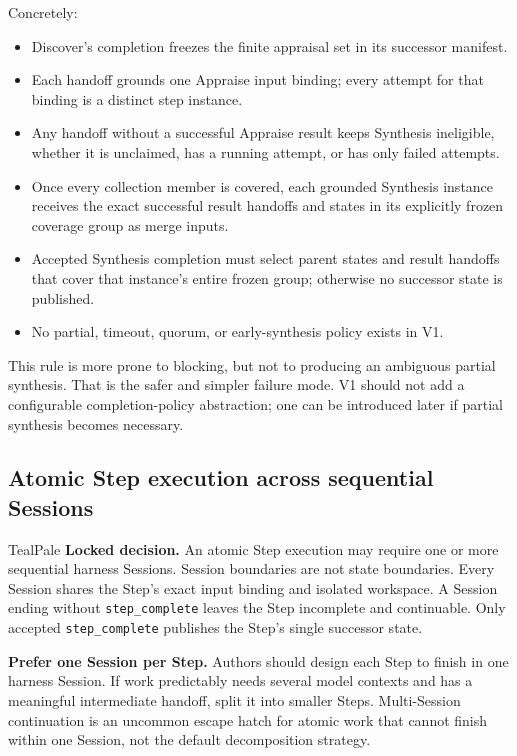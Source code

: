 \documentclass[11pt]{article}
\begin{document}
Concretely:

\begin{itemize}
  \item Discover's completion freezes the finite appraisal set in its successor manifest.
  \item Each handoff grounds one Appraise input binding; every attempt for that binding is a distinct step instance.
  \item Any handoff without a successful Appraise result keeps Synthesis ineligible, whether it is unclaimed, has a running attempt, or has only failed attempts.
  \item Once every collection member is covered, each grounded Synthesis instance receives the exact successful result handoffs and states in its explicitly frozen coverage group as merge inputs.
  \item Accepted Synthesis completion must select parent states and result handoffs that cover that instance's entire frozen group; otherwise no successor state is published.
  \item No partial, timeout, quorum, or early-synthesis policy exists in V1.
\end{itemize}

This rule is more prone to blocking, but not to producing an ambiguous partial synthesis. That is the safer and simpler failure mode. V1 should not add a configurable completion-policy abstraction; one can be introduced later if partial synthesis becomes necessary.

\clearpage
\thispagestyle{fancy}
\subsection{Atomic Step execution across sequential Sessions}

\begin{decisionbox}{TealPale}
\textbf{Locked decision.} An atomic Step execution may require one or more sequential harness Sessions. Session boundaries are not state boundaries. Every Session shares the Step's exact input binding and isolated workspace. A Session ending without \texttt{step\_complete} leaves the Step incomplete and continuable. Only accepted \texttt{step\_complete} publishes the Step's single successor state.
\end{decisionbox}

\begin{summarybox}
\textbf{Prefer one Session per Step.} Authors should design each Step to finish in one harness Session. If work predictably needs several model contexts and has a meaningful intermediate handoff, split it into smaller Steps. Multi-Session continuation is an uncommon escape hatch for atomic work that cannot finish within one Session, not the default decomposition strategy.
\end{summarybox}
\end{document}
